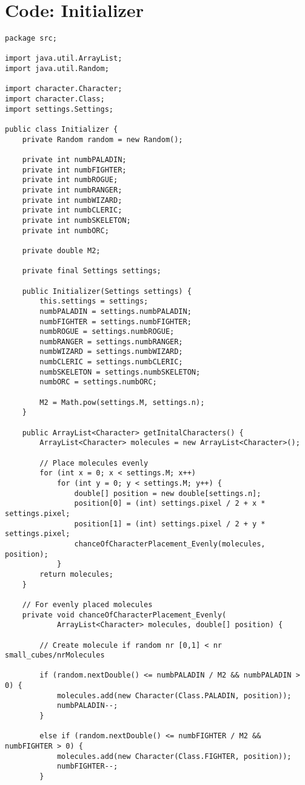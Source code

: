 \documentclass[a4paper,12pt]{article}
\begin{document}
\section{Code: Initializer}
\begin{lstlisting}
package src;

import java.util.ArrayList;
import java.util.Random;

import character.Character;
import character.Class;
import settings.Settings;

public class Initializer {
	private Random random = new Random();

	private int numbPALADIN;
	private int numbFIGHTER;
	private int numbROGUE;
	private int numbRANGER;
	private int numbWIZARD;
	private int numbCLERIC;
	private int numbSKELETON;
	private int numbORC;

	private double M2;

	private final Settings settings;

	public Initializer(Settings settings) {
		this.settings = settings;
		numbPALADIN = settings.numbPALADIN;
		numbFIGHTER = settings.numbFIGHTER;
		numbROGUE = settings.numbROGUE;
		numbRANGER = settings.numbRANGER;
		numbWIZARD = settings.numbWIZARD;
		numbCLERIC = settings.numbCLERIC;
		numbSKELETON = settings.numbSKELETON;
		numbORC = settings.numbORC;

		M2 = Math.pow(settings.M, settings.n);
	}

	public ArrayList<Character> getInitalCharacters() {
		ArrayList<Character> molecules = new ArrayList<Character>();

		// Place molecules evenly
		for (int x = 0; x < settings.M; x++) 
			for (int y = 0; y < settings.M; y++) {
				double[] position = new double[settings.n];
				position[0] = (int) settings.pixel / 2 + x * settings.pixel;
				position[1] = (int) settings.pixel / 2 + y * settings.pixel;
				chanceOfCharacterPlacement_Evenly(molecules, position);
			}
		return molecules;
	}

	// For evenly placed molecules
	private void chanceOfCharacterPlacement_Evenly(
			ArrayList<Character> molecules, double[] position) {

		// Create molecule if random nr [0,1] < nr small_cubes/nrMolecules

		if (random.nextDouble() <= numbPALADIN / M2 && numbPALADIN > 0) {
			molecules.add(new Character(Class.PALADIN, position));
			numbPALADIN--;
		}

		else if (random.nextDouble() <= numbFIGHTER / M2 && numbFIGHTER > 0) {
			molecules.add(new Character(Class.FIGHTER, position));
			numbFIGHTER--;
		}


\end{lstlisting}
\end{document}

